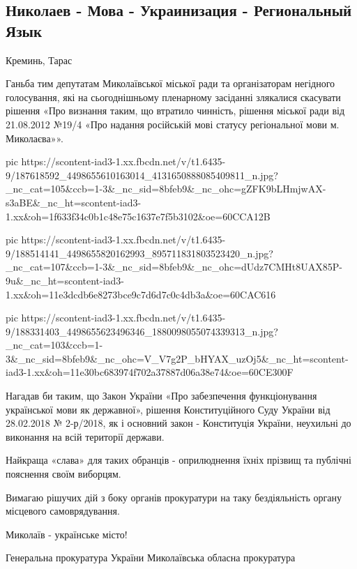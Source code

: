  
 
 
 
 

\subsection{Николаев - Мова - Украинизация - Региональный Язык}
\label{sec:20_05_2021.fb.kremin_taras.1.nikolaev_ukrainizacia}

Креминь, Тарас

Ганьба тим депутатам Миколаївської міської ради та організаторам негідного
голосування, які на сьогоднішньому пленарному засіданні злякалися скасувати
рішення «Про визнання таким, що втратило чинність, рішення міської ради від
21.08.2012 №19/4 «Про надання російській мові статусу регіональної мови м.
Миколаєва»». 

\ifcmt
  pic https://scontent-iad3-1.xx.fbcdn.net/v/t1.6435-9/187618592_4498655610163014_4131650888085409811_n.jpg?_nc_cat=105&ccb=1-3&_nc_sid=8bfeb9&_nc_ohc=gZFK9bLHmjwAX-s3aBE&_nc_ht=scontent-iad3-1.xx&oh=1f633f34c0b1c48e75c1637e7f5b3102&oe=60CCA12B

  pic https://scontent-iad3-1.xx.fbcdn.net/v/t1.6435-9/188514141_4498655820162993_895711831803523420_n.jpg?_nc_cat=107&ccb=1-3&_nc_sid=8bfeb9&_nc_ohc=dUdz7CMHt8UAX85P-9u&_nc_ht=scontent-iad3-1.xx&oh=11e3dcdb6e8273bce9c7d6d7c0c4db3a&oe=60CAC616

  pic https://scontent-iad3-1.xx.fbcdn.net/v/t1.6435-9/188331403_4498655623496346_1880098055074339313_n.jpg?_nc_cat=103&ccb=1-3&_nc_sid=8bfeb9&_nc_ohc=V_V7g2P_bHYAX_uzOj5&_nc_ht=scontent-iad3-1.xx&oh=11e30bc683974f702a37887d06a38e74&oe=60CE300F
\fi


Нагадав би таким, що Закон України «Про забезпечення функціонування української
мови як державної», рішення Конституційного Суду України від 28.02.2018 №
2-р/2018, як і основний закон - Конституція України, неухильні до виконання на
всій території держави.

Найкраща «слава» для таких обранців - оприлюднення їхніх прізвищ та публічні пояснення своїм виборцям. 

Вимагаю рішучих дій з боку органів прокуратури на таку бездіяльність органу місцевого самоврядування.

Миколаїв - українське місто!

Генеральна прокуратура України
Миколаївська обласна прокуратура

